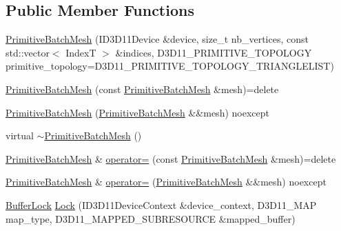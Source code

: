 \subsection*{Public Member Functions}
\begin{DoxyCompactItemize}
\item 
\mbox{\hyperlink{classmage_1_1rendering_1_1_primitive_batch_mesh_aa01b243a0ccb0ed4835c4dcab994d030}{Primitive\+Batch\+Mesh}} (I\+D3\+D11\+Device \&device, size\+\_\+t nb\+\_\+vertices, const std\+::vector$<$ IndexT $>$ \&indices, D3\+D11\+\_\+\+P\+R\+I\+M\+I\+T\+I\+V\+E\+\_\+\+T\+O\+P\+O\+L\+O\+GY primitive\+\_\+topology=D3\+D11\+\_\+\+P\+R\+I\+M\+I\+T\+I\+V\+E\+\_\+\+T\+O\+P\+O\+L\+O\+G\+Y\+\_\+\+T\+R\+I\+A\+N\+G\+L\+E\+L\+I\+ST)
\item 
\mbox{\hyperlink{classmage_1_1rendering_1_1_primitive_batch_mesh_a9f20b29914746fbb29b8c5146f7f63a2}{Primitive\+Batch\+Mesh}} (const \mbox{\hyperlink{classmage_1_1rendering_1_1_primitive_batch_mesh}{Primitive\+Batch\+Mesh}} \&mesh)=delete
\item 
\mbox{\hyperlink{classmage_1_1rendering_1_1_primitive_batch_mesh_ac46a8538b295cf4d85c7309d2bb4cdd5}{Primitive\+Batch\+Mesh}} (\mbox{\hyperlink{classmage_1_1rendering_1_1_primitive_batch_mesh}{Primitive\+Batch\+Mesh}} \&\&mesh) noexcept
\item 
virtual \mbox{\hyperlink{classmage_1_1rendering_1_1_primitive_batch_mesh_a96bb7d8ce20047163ec851b426087c80}{$\sim$\+Primitive\+Batch\+Mesh}} ()
\item 
\mbox{\hyperlink{classmage_1_1rendering_1_1_primitive_batch_mesh}{Primitive\+Batch\+Mesh}} \& \mbox{\hyperlink{classmage_1_1rendering_1_1_primitive_batch_mesh_a64b661150ec319d4dab092d44315bb67}{operator=}} (const \mbox{\hyperlink{classmage_1_1rendering_1_1_primitive_batch_mesh}{Primitive\+Batch\+Mesh}} \&mesh)=delete
\item 
\mbox{\hyperlink{classmage_1_1rendering_1_1_primitive_batch_mesh}{Primitive\+Batch\+Mesh}} \& \mbox{\hyperlink{classmage_1_1rendering_1_1_primitive_batch_mesh_a36409f6de1208f30069309675b19feb2}{operator=}} (\mbox{\hyperlink{classmage_1_1rendering_1_1_primitive_batch_mesh}{Primitive\+Batch\+Mesh}} \&\&mesh) noexcept
\item 
\mbox{\hyperlink{classmage_1_1rendering_1_1_buffer_lock}{Buffer\+Lock}} \mbox{\hyperlink{classmage_1_1rendering_1_1_primitive_batch_mesh_a9f7559afb797103d6c0f9d3c0cb3a0f3}{Lock}} (I\+D3\+D11\+Device\+Context \&device\+\_\+context, D3\+D11\+\_\+\+M\+AP map\+\_\+type, D3\+D11\+\_\+\+M\+A\+P\+P\+E\+D\+\_\+\+S\+U\+B\+R\+E\+S\+O\+U\+R\+CE \&mapped\+\_\+buffer)
\end{DoxyCompactItemize}
